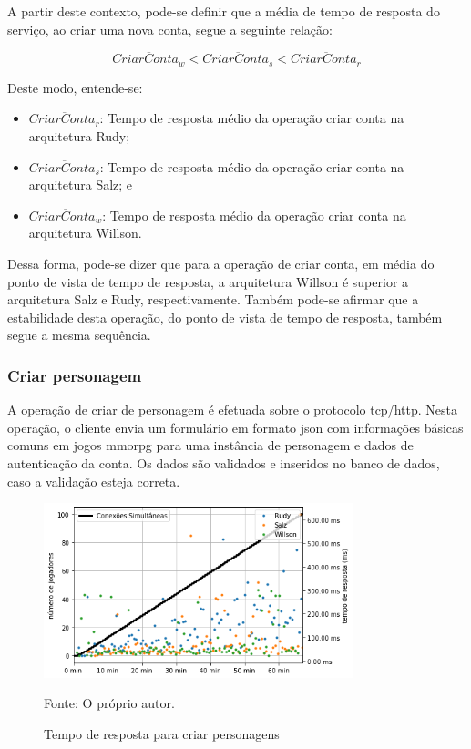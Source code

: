 A partir deste contexto, pode-se definir que a média de tempo de resposta do serviço, ao criar uma nova conta, segue a seguinte relação:

$$
  \overline{CriarConta_{w}} < \overline{CriarConta_{s}} < \overline{CriarConta_{r}}
$$

Deste modo, entende-se:

\begin{itemize}
 \item $\overline{CriarConta_{r}}$: Tempo de resposta médio da operação criar conta na arquitetura Rudy;
 \item $\overline{CriarConta_{s}}$: Tempo de resposta médio da operação criar conta na arquitetura Salz; e
 \item $\overline{CriarConta_{w}}$: Tempo de resposta médio da operação criar conta na arquitetura Willson.
\end{itemize}

Dessa forma, pode-se dizer que para a operação de criar conta, em média do ponto de vista de tempo de resposta, a arquitetura Willson é superior a arquitetura Salz e Rudy, respectivamente.
%
Também pode-se afirmar que a estabilidade desta operação, do ponto de vista de tempo de resposta, também segue a mesma sequência.

\subsubsection{Criar personagem}
\label{sec:op_create_char}

A operação de criar de personagem é efetuada sobre o protocolo \ac{tcp}/\ac{http}.
%
Nesta operação, o cliente envia um formulário em formato \ac{json} com informações básicas comuns em jogos \ac{mmorpg} para uma instância de personagem e dados de autenticação da conta.
%
Os dados são validados e inseridos no banco de dados, caso a validação esteja correta.

\begin{figure}[htb!]
  \caption{Tempo de resposta para criar personagens}
  \label{fig:create_character_operation_request}
  \includegraphics[width=0.8\textwidth]{figuras/analise/rt/create_character_operation_request.png}
  \centering

  Fonte: O próprio autor.
\end{figure}

